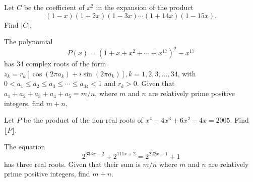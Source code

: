 \begin{question}[name={2004 AIME I, \href{https://artofproblemsolving.com/community/c4p292971}{Problem 7}}]
	Let $C$ be the coefficient of $x^2$ in the expansion of the product\[(1 - x)(1 + 2x)(1 - 3x)\cdots(1 + 14x)(1 - 15x).\]Find $|C|$.
\end{question}


%	














\begin{question}[name={2004 AIME I, \href{https://artofproblemsolving.com/community/c4p378129}{Problem 13}}]
	The polynomial\[P(x)=(1+x+x^2+\cdots+x^{17})^2-x^{17}\]has 34 complex roots of the form $z_k=r_k[\cos(2\pi a_k)+i\sin(2\pi a_k)], k=1, 2, 3,\ldots, 34$, with $0<a_1\le a_2\le a_3\le\cdots\le a_{34}<1$ and $r_k>0$. Given that $a_1+a_2+a_3+a_4+a_5=m/n$, where $m$ and $n$ are relatively prime positive integers, find $m+n$.
\end{question}


%	













\begin{question}[name={2005 AIME I, \href{https://artofproblemsolving.com/community/c4p365524}{Problem 6}}]
	Let $P$ be the product of the non-real roots of $x^4-4x^3+6x^2-4x=2005$. Find $\lfloor P\rfloor$.	
	
\end{question}


%	










\begin{question}[name={2005 AIME I, \href{https://artofproblemsolving.com/community/c4p365560}{Problem 8}}]
	The equation\[2^{333x-2}+2^{111x+2}=2^{222x+1}+1\]has three real roots. Given that their sum is $m/n$ where $m$ and $n$ are relatively prime positive integers, find $m+n$.
\end{question}



